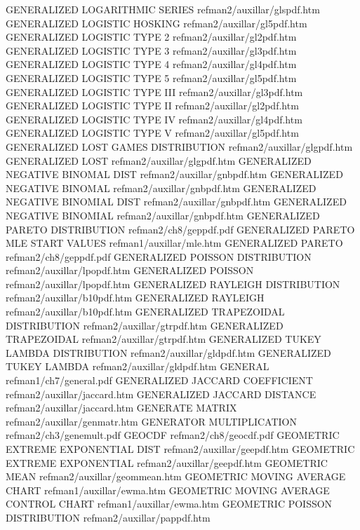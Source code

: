 GENERALIZED LOGARITHMIC SERIES          refman2/auxillar/glspdf.htm
GENERALIZED LOGISTIC HOSKING            refman2/auxillar/gl5pdf.htm
GENERALIZED LOGISTIC TYPE 2             refman2/auxillar/gl2pdf.htm
GENERALIZED LOGISTIC TYPE 3             refman2/auxillar/gl3pdf.htm
GENERALIZED LOGISTIC TYPE 4             refman2/auxillar/gl4pdf.htm
GENERALIZED LOGISTIC TYPE 5             refman2/auxillar/gl5pdf.htm
GENERALIZED LOGISTIC TYPE III           refman2/auxillar/gl3pdf.htm
GENERALIZED LOGISTIC TYPE II            refman2/auxillar/gl2pdf.htm
GENERALIZED LOGISTIC TYPE IV            refman2/auxillar/gl4pdf.htm
GENERALIZED LOGISTIC TYPE V             refman2/auxillar/gl5pdf.htm
GENERALIZED LOST GAMES DISTRIBUTION     refman2/auxillar/glgpdf.htm
GENERALIZED LOST                        refman2/auxillar/glgpdf.htm
GENERALIZED NEGATIVE BINOMAL DIST       refman2/auxillar/gnbpdf.htm
GENERALIZED NEGATIVE BINOMAL            refman2/auxillar/gnbpdf.htm
GENERALIZED NEGATIVE BINOMIAL DIST      refman2/auxillar/gnbpdf.htm
GENERALIZED NEGATIVE BINOMIAL           refman2/auxillar/gnbpdf.htm
GENERALIZED PARETO DISTRIBUTION         refman2/ch8/geppdf.pdf
GENERALIZED PARETO MLE START VALUES     refman1/auxillar/mle.htm
GENERALIZED PARETO                      refman2/ch8/geppdf.pdf
GENERALIZED POISSON DISTRIBUTION        refman2/auxillar/lpopdf.htm
GENERALIZED POISSON                     refman2/auxillar/lpopdf.htm
GENERALIZED RAYLEIGH DISTRIBUTION       refman2/auxillar/b10pdf.htm
GENERALIZED RAYLEIGH                    refman2/auxillar/b10pdf.htm
GENERALIZED TRAPEZOIDAL DISTRIBUTION    refman2/auxillar/gtrpdf.htm
GENERALIZED TRAPEZOIDAL                 refman2/auxillar/gtrpdf.htm
GENERALIZED TUKEY LAMBDA DISTRIBUTION   refman2/auxillar/gldpdf.htm
GENERALIZED TUKEY LAMBDA                refman2/auxillar/gldpdf.htm
GENERAL                                 refman1/ch7/general.pdf
GENERALIZED JACCARD COEFFICIENT         refman2/auxillar/jaccard.htm
GENERALIZED JACCARD DISTANCE            refman2/auxillar/jaccard.htm
GENERATE MATRIX                         refman2/auxillar/genmatr.htm
GENERATOR MULTIPLICATION                refman2/ch3/genemult.pdf
GEOCDF                                  refman2/ch8/geocdf.pdf
GEOMETRIC EXTREME EXPONENTIAL DIST      refman2/auxillar/geepdf.htm
GEOMETRIC EXTREME EXPONENTIAL           refman2/auxillar/geepdf.htm
GEOMETRIC MEAN                          refman2/auxillar/geommean.htm
GEOMETRIC MOVING AVERAGE CHART          refman1/auxillar/ewma.htm
GEOMETRIC MOVING AVERAGE CONTROL CHART  refman1/auxillar/ewma.htm
GEOMETRIC POISSON DISTRIBUTION          refman2/auxillar/pappdf.htm
